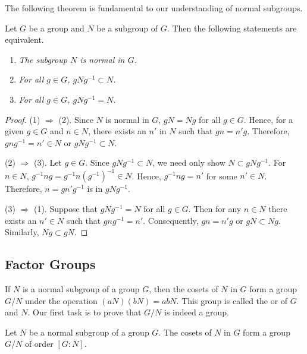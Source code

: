  
The following theorem is fundamental to our understanding of normal
subgroups.
 
 
\begin{theorem}\label{normal:normalequivalents}
Let $G$ be a group and $N$ be a subgroup of $G$. Then the following
statements are equivalent.
\begin{enumerate}
 
\rm \item \it
The subgroup $N$ is normal in $G$. 
 
\rm \item \it
For all $g \in G$, $gNg^{-1} \subset N$. 
 
\rm \item \it
For all $g \in G$, $gNg^{-1} = N$.
 
\end{enumerate}
\end{theorem}
 
 
\begin{proof}
(1) $\Rightarrow$ (2).
Since $N$ is normal in $G$, $gN = Ng$ for all $g \in G$. Hence, for a
given $g \in G$ and $n \in N$, there exists an $n'$ in $N$ such that
$g n = n' g$. Therefore, $gng^{-1} = n' \in N$ or $gNg^{-1} \subset
N$.
 
 
(2)  $\Rightarrow$ (3).  
Let $g \in G$. Since $gNg^{-1} \subset N$, we need only show $N
\subset gNg^{-1}$. For $n \in N$,  $g^{-1}ng=g^{-1}n(g^{-1})^{-1} \in
N$.  Hence, $g^{-1}ng = n'$ for some $n' \in N$. Therefore, $n = g n'
g^{-1}$ is in $g N g^{-1}$.
 
 
(3) $\Rightarrow$ (1).
Suppose that $gNg^{-1} = N$ for all $g \in G$. Then for any $n \in N$
there exists an $n' \in N$ such that $gng^{-1} = n'$.  Consequently,
$gn = n' g$ or $gN \subset Ng$. Similarly, $Ng \subset gN$.
\end{proof}
 
 
\subsection*{Factor Groups}
 
 
If $N$ is a normal subgroup of a group $G$, then the cosets of $N$ in
$G$ form a group $G/N$\label{notefactor} under the operation $(aN)
(bN) = abN$. This group is called the  or  of $G$ and $N$.  Our first task is to
prove that $G/N$ is indeed a group.  
 
 
\begin{theorem}
Let $N$ be a normal subgroup of a group $G$. The cosets of $N$ in $G$
form a group $G/N$ of order $[G:N]$. 
\end{theorem}
 

